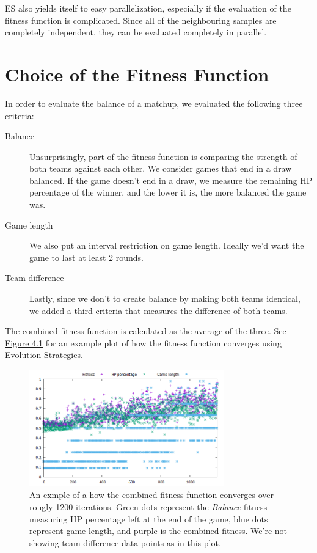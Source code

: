 ES also yields itself to easy parallelization, especially if the evaluation of the fitness
function is complicated. Since all of the neighbouring samples are completely independent,
they can be evaluated completely in parallel.

\section{Choice of the Fitness Function}

In order to evaluate the balance of a matchup, we evaluated the following three
criteria:

\begin{description}
\item [Balance] Unsurprisingly, part of the fitness function is comparing the
  strength of both teams against each other.  We consider games that end in a
    draw balanced.  If the game doesn't end in a draw, we measure the remaining
    HP percentage of the winner, and the lower it is, the more balanced the
    game was.
\item [Game length] We also put an interval restriction on game length. Ideally
  we'd want the game to last at least 2 rounds.
\item [Team difference] Lastly, since we don't to create balance by making both
  teams identical, we added a third criteria that measures the difference of
    both teams.
\end{description}

The combined fitness function is calculated as the average of the three. See \hyperref[fig:converging-es]{Figure 4.1} for an example
plot of how the fitness function converges using Evolution Strategies.

\begin{figure}
	\centering
	\includegraphics[width=0.75\textwidth]{img/converging-es.png}
	\caption{An exmple of a how the combined fitness function converges over rougly 1200 iterations. Green dots represent the \emph{Balance} fitness measuring HP percentage left at the end of the game, blue dots represent game length, and purple is the combined fitness. We're not showing team difference data points as in this plot.}
	\label{fig:converging-es}	
\end{figure}

